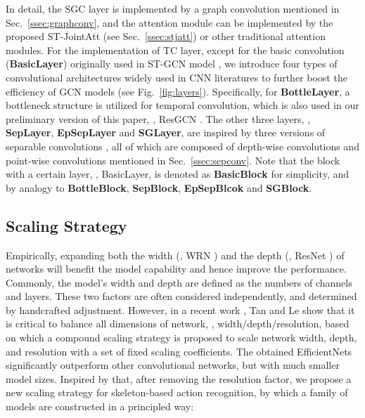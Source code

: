 \documentclass[10pt,journal,compsoc]{IEEEtran}
\begin{document}
In detail, the SGC layer is implemented by a graph convolution mentioned in Sec.~\ref{ssec:graphconv}, and the attention module can be implemented by the proposed ST-JointAtt (see Sec.~\ref{ssec:stjatt}) or other traditional attention modules. For the implementation of TC layer, except for the basic  convolution ({\bf BasicLayer}) originally used in ST-GCN model \cite{yan2018spatial}, we introduce four types of convolutional architectures widely used in CNN literatures to further boost the efficiency of GCN models (see Fig.~\ref{fig:layers}). Specifically, for {\bf BottleLayer}, a bottleneck structure \cite{he2016deep} is utilized for temporal convolution, which is also used in our preliminary version of this paper, \ie, ResGCN \cite{song2020stronger}. The other three layers, \ie, {\bf SepLayer}, {\bf EpSepLayer} and {\bf SGLayer}, are inspired by three versions of separable convolutions \cite{howard2017mobilenets,sandler2018mobilenetv2,zhou2020rethinking}, all of which are composed of depth-wise convolutions and point-wise convolutions mentioned in Sec.~\ref{ssec:sepconv}. Note that the block with a certain layer, \eg, BasicLayer, is denoted as {\bf BasicBlock} for simplicity, and by analogy to {\bf BottleBlock}, {\bf SepBlock}, {\bf EpSepBlcok} and {\bf SGBlock}.

\subsection{Scaling Strategy}
\label{ssec:scaling}

Empirically, expanding both the width (\eg, WRN \cite{zagoruyko2016wide}) and the depth (\eg, ResNet \cite{he2016deep}) of networks will benefit the model capability and hence improve the performance. Commonly, the model's width and depth are defined as the numbers of channels and layers. These two factors are often considered independently, and determined by handcrafted adjustment. However, in a recent work \etal \cite{tan2019efficientnet}, Tan and Le show that it is critical to balance all dimensions of network, \eg, width/depth/resolution, based on which a compound scaling strategy is proposed to scale network width, depth, and resolution with a set of fixed scaling coefficients. The obtained EfficientNets significantly outperform other convolutional networks, but with much smaller model sizes. Inspired by that, after removing the resolution factor, we propose a new scaling strategy for skeleton-based action recognition, by which a family of models are constructed in a principled way:
\end{document}

